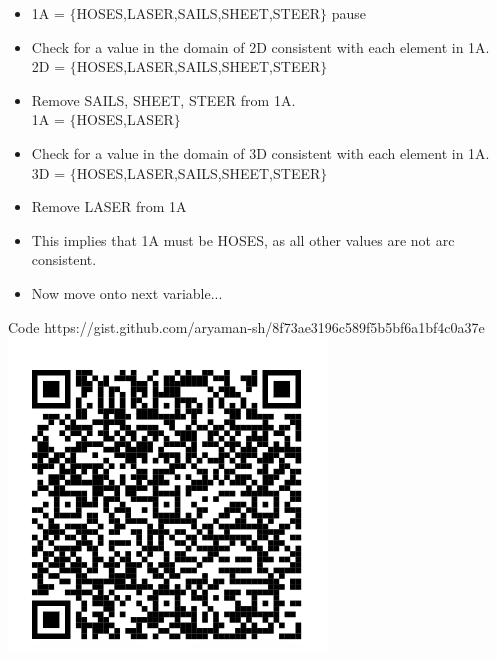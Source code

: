 \documentclass[11pt]{beamer}
\begin{document}
\begin{frame}{4.4}
\begin{itemize}
	\item 1A = $\{$HOSES,LASER,SAILS,SHEET,STEER$\}$ pause
	\item Check for a value in the domain of 2D consistent with each element in 1A. \\
	2D = $\{$HOSES,LASER,SAILS,SHEET,STEER$\}$\pause
	\item Remove SAILS, SHEET, STEER from 1A.\\
	1A = $\{$HOSES,LASER$\}$ \pause
	\item Check for a value in the domain of 3D consistent with each element in 1A.\\
	3D = $\{$HOSES,LASER,SAILS,SHEET,STEER$\}$\pause
	\item Remove LASER from 1A
	\item This implies that 1A must be HOSES, as all other values are not arc consistent.
	\item Now move onto next variable...
\end{itemize}
\end{frame}

\begin{frame}{Code}
https://gist.github.com/aryaman-sh/8f73ae3196c589f5b5bf6a1bf4c0a37e
\\
\includegraphics[scale=0.4]{code.png}
\end{frame}
\end{document}

